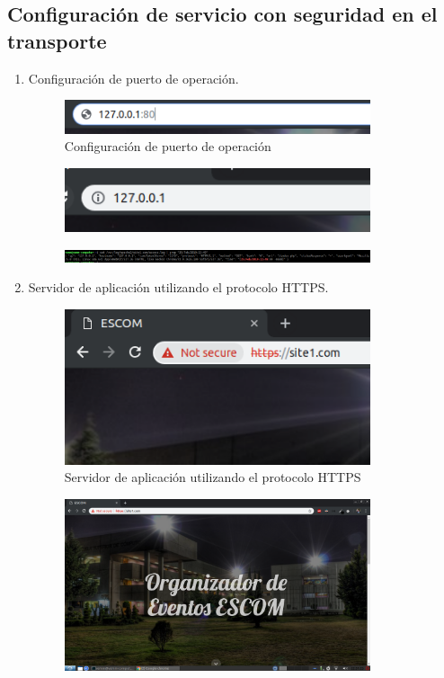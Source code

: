 \subsection{Configuración de servicio con seguridad en el transporte}
	\begin{enumerate}
		\item Configuración de puerto de operación.
			\begin{figure}[htbp]
				\centering
				\includegraphics[width=9cm]{./img/lista/6.png}
				\caption[Configuración de puerto de operación]{Configuración de puerto de operación}
				\label{fig:6}
			\end{figure}
			\begin{figure}[htbp]
			\centering
				\includegraphics[width=9cm]{./img/lista/6_1.png}
				\label{fig:6.1}
			\end{figure}
			\begin{figure}[htbp]
			\centering
				\includegraphics[width=9cm]{./img/lista/6_2.png}
				\label{fig:6.2}
			\end{figure}
		\item Servidor de aplicación utilizando el protocolo HTTPS.
			\begin{figure}[htbp]
				\centering
				\includegraphics[width=9cm]{./img/lista/7.png}
				\caption[Servidor de aplicación utilizando el protocolo HTTPS]{Servidor de aplicación utilizando el protocolo HTTPS}
				\label{fig:7}
			\end{figure}
			\begin{figure}[htbp]
			\centering
				\includegraphics[width=9cm]{./img/lista/7_1.png}

\end{figure}
\end{enumerate}
